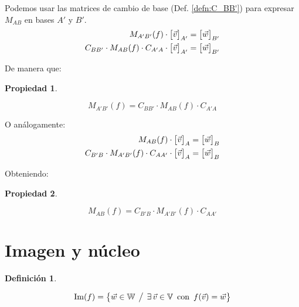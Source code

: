 \documentclass[a5paper,12pt,twoside]{book}
\newtheorem{defn}{{Definición}}[chapter]
\newtheorem{prop}{{Propiedad}}[chapter]
\begin{document}
Podemos usar las matrices de cambio de base (Def. \ref{defn:C_BB'}) para expresar $M_{AB}$ en bases $A'$ y $B'$.
\begin{align*}
    M_{A'B'}(f) \cdot { \begin{bmatrix} \Vec{v} \end{bmatrix} }_{A'} &= { \begin{bmatrix} \Vec{w} \end{bmatrix} }_{B'}
    \\
    C_{BB'} \cdot M_{AB}(f) \cdot C_{A'A} \cdot { \begin{bmatrix} \Vec{v} \end{bmatrix} }_{A'} &= { \begin{bmatrix} \Vec{w} \end{bmatrix} }_{B'}
\end{align*}

De manera que:

\begin{mdframed}[style=MyFrame1]
    \begin{prop}
    \end{prop}
    \begin{equation*}
        M_{A'B'}(f) = C_{BB'} \cdot M_{AB}(f) \cdot C_{A'A}
    \end{equation*}
\end{mdframed}

O análogamente:
\begin{align*}
    M_{AB}(f) \cdot { \begin{bmatrix} \Vec{v} \end{bmatrix} }_A &= { \begin{bmatrix} \Vec{w} \end{bmatrix} }_B
    \\
    C_{B'B} \cdot M_{A'B'}(f) \cdot C_{AA'} \cdot { \begin{bmatrix} \Vec{v} \end{bmatrix} }_A &= { \begin{bmatrix} \Vec{w} \end{bmatrix} }_B
\end{align*}

Obteniendo:

\begin{mdframed}[style=MyFrame1]
    \begin{prop}
        \label{prop:M_BB}
    \end{prop}
    \begin{equation*}
        M_{AB}(f) = C_{B'B} \cdot M_{A'B'}(f) \cdot C_{AA'}
    \end{equation*}
\end{mdframed}


\section{Imagen y núcleo}

\begin{mdframed}[style=MyFrame1]
    \begin{defn}
    \end{defn}
    \begin{equation*}
        \operatorname{Im}(f) = { \left\{ {\Vec{w} \in \mathbb{W} \hspace{1ex} \big/ \hspace{1ex} \exists \, \Vec{v} \in \mathbb{V} \enspace \textrm{con} \enspace f(\Vec{v}) = \Vec{w}} \right\} }
    \end{equation*}
\end{mdframed}
\end{document}
